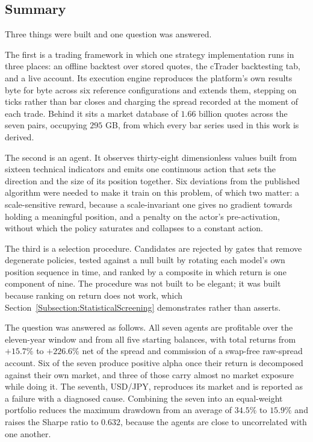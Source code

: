 \subsection{Summary}
\label{Subsection:Summary}

Three things were built and one question was answered.

The first is a trading framework in which one strategy implementation runs in three places: an offline backtest over stored quotes, the cTrader backtesting tab, and a live account. Its execution engine reproduces the platform's own results byte for byte across six reference configurations and extends them, stepping on ticks rather than bar closes and charging the spread recorded at the moment of each trade. Behind it sits a market database of $1.66$ billion quotes across the seven pairs, occupying $295$ GB, from which every bar series used in this work is derived.

The second is an agent. It observes thirty-eight dimensionless values built from sixteen technical indicators and emits one continuous action that sets the direction and the size of its position together. Six deviations from the published algorithm were needed to make it train on this problem, of which two matter: a scale-sensitive reward, because a scale-invariant one gives no gradient towards holding a meaningful position, and a penalty on the actor's pre-activation, without which the policy saturates and collapses to a constant action.

The third is a selection procedure. Candidates are rejected by gates that remove degenerate policies, tested against a null built by rotating each model's own position sequence in time, and ranked by a composite in which return is one component of nine. The procedure was not built to be elegant; it was built because ranking on return does not work, which Section~\ref{Subsection:StatisticalScreening} demonstrates rather than asserts.

The question was answered as follows. All seven agents are profitable over the eleven-year window and from all five starting balances, with total returns from $+15.7\%$ to $+226.6\%$ net of the spread and commission of a swap-free raw-spread account. Six of the seven produce positive alpha once their return is decomposed against their own market, and three of those carry almost no market exposure while doing it. The seventh, USD/JPY, reproduces its market and is reported as a failure with a diagnosed cause. Combining the seven into an equal-weight portfolio reduces the maximum drawdown from an average of $34.5\%$ to $15.9\%$ and raises the Sharpe ratio to $0.632$, because the agents are close to uncorrelated with one another.

